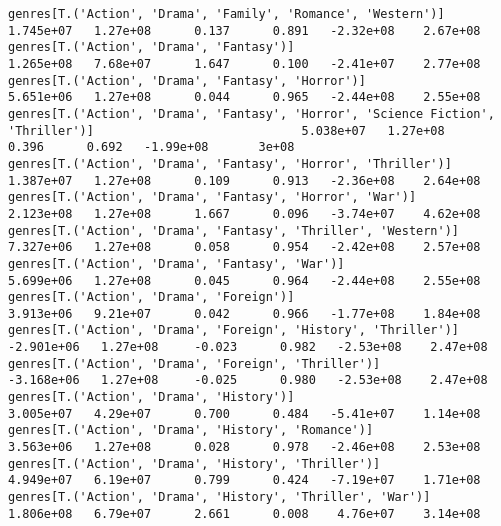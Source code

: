 \documentclass[11pt]{article}
\begin{document}
\begin{Verbatim}[commandchars=\\\{\}]
genres[T.('Action', 'Drama', 'Family', 'Romance', 'Western')]                                                 1.745e+07   1.27e+08      0.137      0.891   -2.32e+08    2.67e+08
genres[T.('Action', 'Drama', 'Fantasy')]                                                                      1.265e+08   7.68e+07      1.647      0.100   -2.41e+07    2.77e+08
genres[T.('Action', 'Drama', 'Fantasy', 'Horror')]                                                            5.651e+06   1.27e+08      0.044      0.965   -2.44e+08    2.55e+08
genres[T.('Action', 'Drama', 'Fantasy', 'Horror', 'Science Fiction', 'Thriller')]                             5.038e+07   1.27e+08      0.396      0.692   -1.99e+08       3e+08
genres[T.('Action', 'Drama', 'Fantasy', 'Horror', 'Thriller')]                                                1.387e+07   1.27e+08      0.109      0.913   -2.36e+08    2.64e+08
genres[T.('Action', 'Drama', 'Fantasy', 'Horror', 'War')]                                                     2.123e+08   1.27e+08      1.667      0.096   -3.74e+07    4.62e+08
genres[T.('Action', 'Drama', 'Fantasy', 'Thriller', 'Western')]                                               7.327e+06   1.27e+08      0.058      0.954   -2.42e+08    2.57e+08
genres[T.('Action', 'Drama', 'Fantasy', 'War')]                                                               5.699e+06   1.27e+08      0.045      0.964   -2.44e+08    2.55e+08
genres[T.('Action', 'Drama', 'Foreign')]                                                                      3.913e+06   9.21e+07      0.042      0.966   -1.77e+08    1.84e+08
genres[T.('Action', 'Drama', 'Foreign', 'History', 'Thriller')]                                              -2.901e+06   1.27e+08     -0.023      0.982   -2.53e+08    2.47e+08
genres[T.('Action', 'Drama', 'Foreign', 'Thriller')]                                                         -3.168e+06   1.27e+08     -0.025      0.980   -2.53e+08    2.47e+08
genres[T.('Action', 'Drama', 'History')]                                                                      3.005e+07   4.29e+07      0.700      0.484   -5.41e+07    1.14e+08
genres[T.('Action', 'Drama', 'History', 'Romance')]                                                           3.563e+06   1.27e+08      0.028      0.978   -2.46e+08    2.53e+08
genres[T.('Action', 'Drama', 'History', 'Thriller')]                                                          4.949e+07   6.19e+07      0.799      0.424   -7.19e+07    1.71e+08
genres[T.('Action', 'Drama', 'History', 'Thriller', 'War')]                                                   1.806e+08   6.79e+07      2.661      0.008    4.76e+07    3.14e+08

\end{Verbatim}
\end{document}
